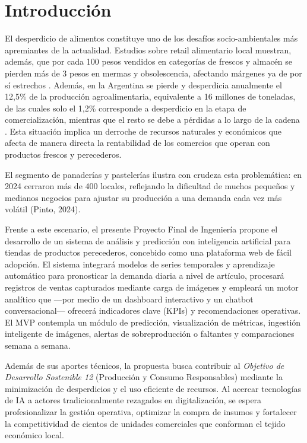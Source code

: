 \chapter{Introducción}

El desperdicio de alimentos constituye uno de los desafíos socio-ambientales más apremiantes de la actualidad. Estudios sobre retail alimentario local muestran, además, que por cada 100 pesos vendidos en categorías de frescos y almacén se pierden más de 3 pesos en mermas y obsolescencia, afectando márgenes ya de por sí estrechos \parencite{weteam2021}. Además, en la Argentina se pierde y desperdicia anualmente el 12,5\% de la producción agroalimentaria, equivalente a 16 millones de toneladas, de las cuales solo el 1,2\% corresponde a desperdicio en la etapa de comercialización, mientras que el resto se debe a pérdidas a lo largo de la cadena \parencite{tiscornia2022}. Esta situación implica un derroche de recursos naturales y económicos que afecta de manera directa la rentabilidad de los comercios que operan con productos frescos y perecederos.

El segmento de panaderías y pastelerías ilustra con crudeza esta problemática: en 2024 cerraron más de 400 locales, reflejando la dificultad de muchos pequeños y medianos negocios para ajustar su producción a una demanda cada vez más volátil (Pinto, 2024). 

Frente a este escenario, el presente Proyecto Final de Ingeniería propone el desarrollo de un sistema de análisis y predicción con inteligencia artificial para tiendas de productos perecederos, concebido como una plataforma web de fácil adopción. El sistema integrará modelos de series temporales y aprendizaje automático para pronosticar la demanda diaria a nivel de artículo, procesará registros de ventas capturados mediante carga de imágenes y empleará un motor analítico que —por medio de un dashboard interactivo y un chatbot conversacional— ofrecerá indicadores clave (KPIs) y recomendaciones operativas. El MVP contempla un módulo de predicción, visualización de métricas, ingestión inteligente de imágenes, alertas de sobreproducción o faltantes y comparaciones semana a semana.

Además de sus aportes técnicos, la propuesta busca contribuir al \emph{Objetivo de Desarrollo Sostenible 12} (Producción y Consumo Responsables) mediante la minimización de desperdicios y el uso eficiente de recursos. Al acercar tecnologías de IA a actores tradicionalmente rezagados en digitalización, se espera profesionalizar la gestión operativa, optimizar la compra de insumos y fortalecer la competitividad de cientos de unidades comerciales que conforman el tejido económico local.

